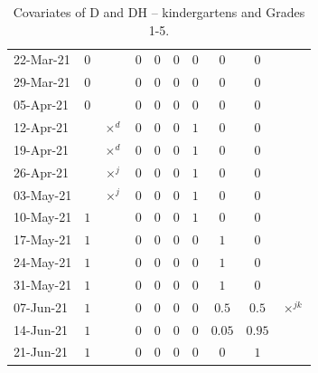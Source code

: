 \documentclass[fleqn,10pt]{wlscirep}
\begin{document}
\begin{table}
\begin{center}
{\begin{tabular}{l|cc|ccccccc}
22-Mar-21	&$0$	&		&$0$	&$0$	&$0$	&$0$	&$0$	&$0$	&	\\
29-Mar-21	&$0$	&		&$0$	&$0$	&$0$	&$0$	&$0$	&$0$	&	\\
05-Apr-21	&$0$	&		&$0$	&$0$	&$0$	&$0$	&$0$	&$0$	&	\\
12-Apr-21	&	&$\times^{d}$		&$0$	&$0$	&$0$	&$1$	&$0$	&$0$	&	\\
19-Apr-21	&	&$\times^{d}$		&$0$	&$0$	&$0$	&$1$	&$0$	&$0$	&	\\
26-Apr-21	&	&$\times^{j}$		&$0$	&$0$	&$0$	&$1$	&$0$	&$0$	&	\\
03-May-21	&	&$\times^{j}$		&$0$	&$0$	&$0$	&$1$	&$0$	&$0$	&	\\
10-May-21	&$1$	&		&$0$	&$0$	&$0$	&$1$	&$0$	&$0$	&	\\
17-May-21	&$1$	&		&$0$	&$0$	&$0$	&$0$	&$1$	&$0$	&	\\
24-May-21	&$1$	&		&$0$	&$0$	&$0$	&$0$	&$1$	&$0$	&	\\
31-May-21	&$1$	&		&$0$	&$0$	&$0$	&$0$	&$1$	&$0$	&	\\
07-Jun-21	&$1$	&		&$0$	&$0$	&$0$	&$0$	&$0.5$	&$0.5$	&$\times^{jk}$	\\
14-Jun-21	&$1$	&		&$0$	&$0$	&$0$	&$0$	&$0.05$	&$0.95$	&	\\
21-Jun-21	&$1$	&		&$0$	&$0$	&$0$	&$0$	&$0$	&$1$	&	\\
\end{tabular}											

}
\caption{Covariates of D and DH -- kindergartens and Grades 1-5.}
\label{tab:cov1}
\end{center}	
\end{table}															
			
\end{document}
